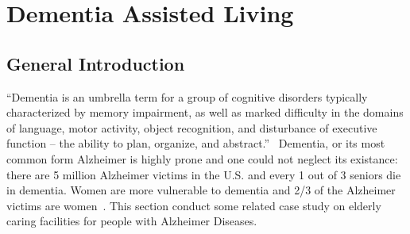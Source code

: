 \section{Dementia Assisted Living}
\subsection{General Introduction}
``Dementia is an umbrella term for a group of cognitive disorders
typically characterized by memory impairment, as well as marked
difficulty in the domains of language, motor activity, object
recognition, and disturbance of executive function – the ability to
plan, organize, and abstract.''~\cite{CDCdementia} Dementia, or its
most common form Alzheimer is highly prone and one could not neglect
its existance: there are 5 million Alzheimer victims in the U.S. and
every 1 out of 3 seniors die in dementia. Women are more vulnerable to
dementia and 2/3 of the Alzheimer victims are
women~\cite{alzorg2014}. This section conduct some related case study
on elderly caring facilities for people with Alzheimer Diseases. 

